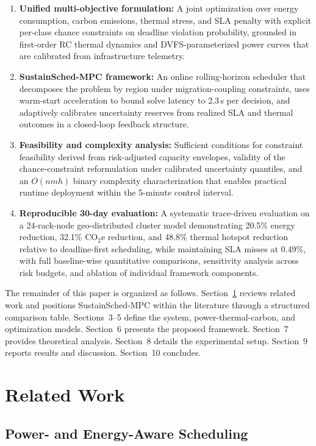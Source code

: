\documentclass[a4paper,fleqn]{cas-dc}
\begin{document}
\begin{enumerate}
\item \textbf{Unified multi-objective formulation:} A joint optimization over energy consumption, carbon emissions, thermal stress, and SLA penalty with explicit per-class chance constraints on deadline violation probability, grounded in first-order RC thermal dynamics and DVFS-parameterized power curves that are calibrated from infrastructure telemetry.
\item \textbf{SustainSched-MPC framework:} An online rolling-horizon scheduler that decomposes the problem by region under migration-coupling constraints, uses warm-start acceleration to bound solve latency to 2.3\,s per decision, and adaptively calibrates uncertainty reserves from realized SLA and thermal outcomes in a closed-loop feedback structure.
\item \textbf{Feasibility and complexity analysis:} Sufficient conditions for constraint feasibility derived from risk-adjusted capacity envelopes, validity of the chance-constraint reformulation under calibrated uncertainty quantiles, and an $O(nmh)$ binary complexity characterization that enables practical runtime deployment within the 5-minute control interval.
\item \textbf{Reproducible 30-day evaluation:} A systematic trace-driven evaluation on a 24-rack-node geo-distributed cluster model demonstrating 20.5\% energy reduction, 32.1\% CO$_{2}$e reduction, and 48.8\% thermal hotspot reduction relative to deadline-first scheduling, while maintaining SLA misses at 0.49\%, with full baseline-wise quantitative comparisons, sensitivity analysis across risk budgets, and ablation of individual framework components.
\end{enumerate}

The remainder of this paper is organized as follows. Section~\ref{sec:related} reviews related work and positions SustainSched-MPC within the literature through a structured comparison table. Sections~3--5 define the system, power-thermal-carbon, and optimization models. Section~6 presents the proposed framework. Section~7 provides theoretical analysis. Section~8 details the experimental setup. Section~9 reports results and discussion. Section~10 concludes.

\section{Related Work}
\label{sec:related}

\subsection{Power- and Energy-Aware Scheduling}
\end{document}
